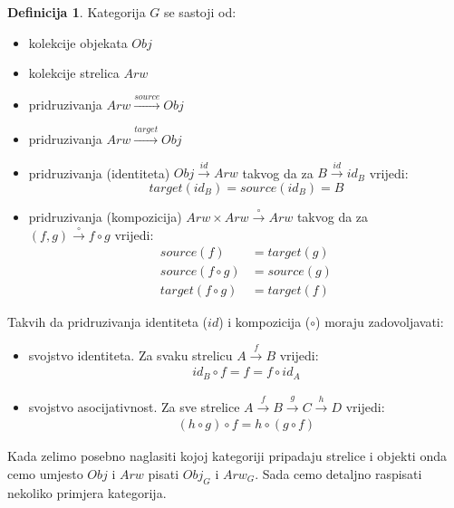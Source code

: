 \documentclass[11pt]{article}
\theoremstyle{definition}
\newtheorem{definition}{Definicija}
\begin{document}
  \begin{definition}
    Kategorija $G$ se sastoji od:
    \begin{itemize}
      \item kolekcije objekata $Obj$
      \item kolekcije strelica $Arw$
      \item pridruzivanja $Arw \xrightarrow{source} Obj$
      \item pridruzivanja $Arw \xrightarrow{target} Obj$
      \item pridruzivanja (identiteta) $Obj \xrightarrow{id} Arw$ takvog da
      za $B \xrightarrow{id} id_B$ vrijedi:
        \begin{equation}
          target(id_B) = source(id_B) = B
        \end{equation}
      \item pridruzivanja (kompozicija) $Arw \times Arw \xrightarrow{\circ}
      Arw$ takvog da za \\ $(f, g) \xrightarrow{\circ} f \circ g$ vrijedi:
        \begin{align}
          source(f) &= target(g) \\
          source(f \circ g) &= source(g) \\
          target(f \circ g) &= target(f)
        \end{align}
    \end{itemize}
    Takvih da pridruzivanja identiteta ($id$) i kompozicija ($\circ$) moraju
    zadovoljavati:
    \begin{itemize}
      \item svojstvo identiteta. Za svaku strelicu $A \xrightarrow{f} B$ vrijedi:
        \begin{align}
          id_B \circ f = f = f \circ id_A
        \end{align}
      \item svojstvo asocijativnost. Za sve strelice $A \xrightarrow{f} B
      \xrightarrow{g} C \xrightarrow{h} D$ vrijedi:
        \begin{align}
          (h \circ g) \circ f = h \circ (g \circ f)
        \end{align}
    \end{itemize}
  \end{definition}
  Kada zelimo posebno naglasiti kojoj kategoriji pripadaju strelice i objekti
  onda cemo umjesto $Obj$ i $Arw$ pisati $Obj_G$ i $Arw_G$.
  Sada cemo detaljno raspisati nekoliko primjera kategorija.
\end{document}
